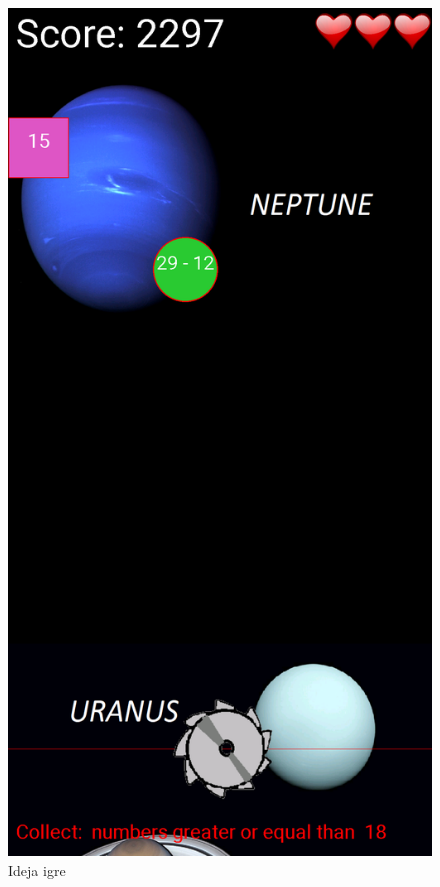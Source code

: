 \documentclass[times, utf8, zavrsni]{fer}
\begin{document}
		\begin{figure}[H]
			\includegraphics[scale = 0.225]{"slike/igra.png"} 
			\centering
			\caption{Ideja igre}
			\label{fig:idejaigre}
		\end{figure}
		
\end{document}

